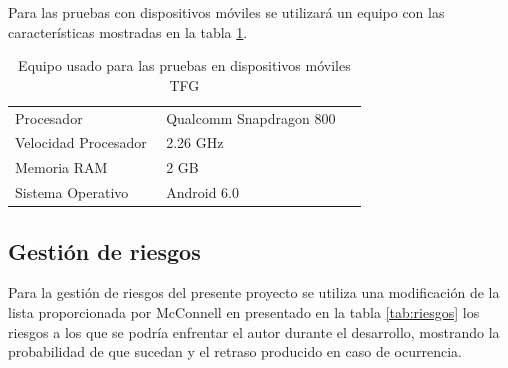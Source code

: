 	Para las pruebas con dispositivos móviles se utilizará un equipo con las características mostradas en la tabla \ref{tab:movil2}.
	\begin{table}[H]
	  \centering 
	  \begin{tabular}{p{0.3\linewidth}p{0.4\linewidth}}
	    \toprule
		Procesador 	& Qualcomm Snapdragon 800		\\
		Velocidad Procesador 	& 2.26 GHz 			\\
		Memoria RAM 			& 2 \ac{GB} 		\\
		Sistema Operativo 		& Android 6.0 		\\
	    \hline
	  \end{tabular}
	  \caption{Equipo usado para las pruebas en dispositivos móviles \ac{TFG}}
	  \label{tab:movil2}
	\end{table}
	
	\subsection{Gestión de riesgos}
	Para la gestión de riesgos del presente proyecto se utiliza una modificación de la lista proporcionada por McConnell en \cite{Mcc97} presentado en la tabla \ref{tab:riesgos}	los riesgos a los que se podría enfrentar el autor durante el desarrollo, mostrando la probabilidad de que sucedan y el retraso producido en caso de ocurrencia.
	
